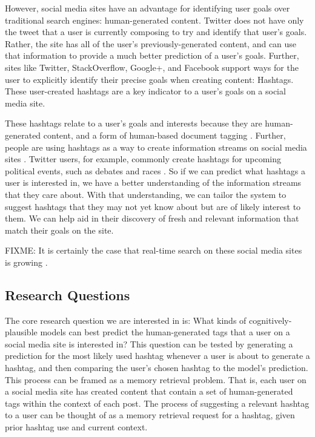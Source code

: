 \documentclass[man]{apa6}
\begin{document}
However, social media sites have an advantage for identifying user goals over traditional search engines:
human-generated content.
Twitter does not have only the tweet that a user is currently composing to try and identify that user's goals.
Rather, the site has all of the user's previously-generated content, and can use that information to provide a much better prediction of a user's goals.
Further, sites like Twitter, StackOverflow, Google+, and Facebook support ways for the user to explicitly identify their precise goals when creating content: Hashtags.
These user-created hashtags are a key indicator to a user's goals on a social media site. 

These hashtags relate to a user's goals and interests because they are human-generated content, and a form of human-based document tagging \parencite{Chang2010}.
Further, people are using hashtags as a way to create information streams on social media sites \parencite{Kwak2010}.
Twitter users, for example, commonly create hashtags for upcoming political events, such as debates and races \parencite{Diakopoulos2010}.
So if we can predict what hashtags a user is interested in, we have a better understanding of the information streams that they care about.
With that understanding, we can tailor the system to suggest hashtags that they may not yet know about but are of likely interest to them.
We can help aid in their discovery of fresh and relevant information that match their goals on the site.

FIXME: It is certainly the case that real-time search on these social media sites is growing \parencite{Jansen2011}.

\subsection{Research Questions}

The core research question we are interested in is:
What kinds of cognitively-plausible models can best predict the human-generated tags that a user on a social media site is interested in?
This question can be tested by generating a prediction for the most likely used hashtag whenever a user is about to generate a hashtag, and then comparing the user's chosen hashtag to the model's prediction.
This process can be framed as a memory retrieval problem.
That is, each user on a social media site has created content that contain a set of human-generated tags within the context of each post.
The process of suggesting a relevant hashtag to a user can be thought of as a memory retrieval request for a hashtag, given prior hashtag use and current context.
\end{document}
